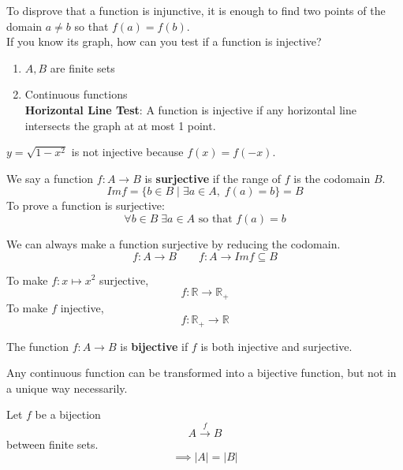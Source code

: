 \documentclass[letterpaper, 12pt]{article}
\newenvironment{definition}[1][Definition]{\begin{trivlist}
\item[\hskip \labelsep {\bfseries #1}]}{\end{trivlist}}
\newenvironment{example}[1][Example]{\begin{trivlist}
\item[\hskip \labelsep {\bfseries #1}]}{\end{trivlist}}
\newenvironment{remark}[1][Remark]{\begin{trivlist}
\item[\hskip \labelsep {\bfseries #1}]}{\end{trivlist}}
\newcommand{\keyword}[1]{\textbf{#1}}
\begin{document}
    \begin{remark}
        To disprove that a function is injunctive, it is enough to find two points of the 
        domain $a \ne b$ so that $f(a) = f(b)$. \\
        If you know its graph, how can you test if a function is injective?
        \begin{enumerate}
            \item $A, B$ are finite sets
            \item Continuous functions \\
            \keyword{Horizontal Line Test}: A function is injective if any horizontal line 
            intersects the graph at at most 1 point.
        \end{enumerate}
    \end{remark}
    \begin{example}
        $y = \sqrt{1 - x^2}$ is not injective because $f(x) = f(-x)$.
    \end{example}
    \begin{definition}
        We say a function $f: A \rightarrow B$ is \keyword{surjective} if the range of $f$ is 
        the codomain $B$.
        \[Im f = \{b \in B \mid \exists a \in A, \; f(a) = b\} = B\]
        To prove a function is surjective:
        \[\forall b \in B \; \exists a \in A \text{ so that } f(a) = b\]
    \end{definition}
    \begin{remark}
        We can always make a function surjective by reducing the codomain.
        \[f: A \rightarrow B \qquad f: A \rightarrow Im f \subseteq B\]
    \end{remark}
    \begin{example}
        To make $f: x \mapsto x^2$ surjective, 
        \[f: \mathbb{R} \rightarrow \mathbb{R}_+\]
        To make $f$ injective, 
        \[f: \mathbb{R}_+ \rightarrow \mathbb{R}\]
    \end{example}
    \begin{definition}
        The function $f: A \rightarrow B$ is \keyword{bijective} if $f$ is both injective and 
        surjective.
    \end{definition}
    \begin{remark}
        Any continuous function can be transformed into a bijective function, but not in a 
        unique way necessarily.
    \end{remark}
    \begin{remark}
        Let $f$ be a bijection
        \[A \xrightarrow{f} B\]
        between finite sets.
        \[\implies |A| = |B|\]
    \end{remark}
\end{document}
